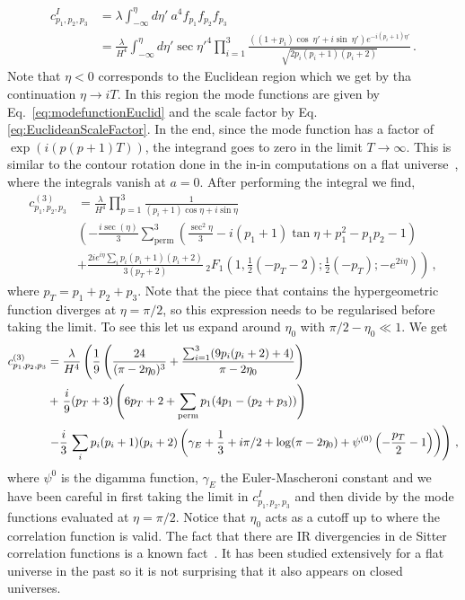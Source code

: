 \documentclass[a4paper,11pt]{article}
\numberwithin{equation}{section}
\numberwithin{equation}{section}
\begin{document}
\begin{align} c^I_{p_1,p_2,p_3}&=\lambda \int_{-\infty}^\eta  d\eta'\  a^4 f_{p_1}f_{p_2}f_{p_3}\\
 &=\frac{\lambda}{H^4}\int_{-\infty}^{\eta} d\eta' \sec{\eta'}^4\prod_{i=1}^3 \frac{((1+p_i)\cos\ \eta'+i\sin\ \eta' )e^{-i(p_i+1)\eta'}}{\sqrt{2p_i(p_i+1)(p_i+2)}} \,.
\end{align}
Note that  $\eta<0$ corresponds to the Euclidean region  which we get by tha continuation $\eta\to i T$. In this region the mode functions are given by Eq.~\eqref{eq:modefunctionEuclid} and the scale factor by Eq.~ \eqref{eq:EuclideanScaleFactor}. In the end, since the mode function has a factor of $\exp(i(p(p+1)T))$, the integrand goes to zero  in the limit $T\to\infty$. This is similar to the contour rotation done in the in-in computations on a flat universe~\cite{Maldacena:2002vr}, where the integrals vanish at $a=0$. 
After performing the integral we find,
\begin{align}
c^{(3)}_{p_1,p_2,p_3}&=\frac{\lambda}{H^4}\prod_{p=1}^3\frac{1}{(p_i+1)\cos\eta+i\sin\eta}\nonumber\\
  & \left(-\frac{i\sec (\eta )}{3} \sum_{\mathrm{perm}}^3\left(\frac{\sec^2\eta}{3}-i (p_1+1)\tan\eta+p_1^2-p_1 p_2-1\right)\right. \nonumber\\
   &\left.+\frac{2 i e^{i \eta }\sum_i p_i (p_i+1)
   (p_i+2)}{3 (p_T+2) } \, _2F_1\left(1,\frac{1}{2}
   (-p_T-2);\frac{1}{2} (-p_T);-e^{2
   i \eta }\right)\right) \,,
\end{align}
where $p_T = p_1 + p_2 + p_3$. Note that the piece that contains the hypergeometric function diverges at $\eta=\pi/2$, so this expression needs to be regularised before taking the limit. To see this let us expand around $\eta_0$ with $\pi/2-\eta_0\ll1$. We get
\begin{align}
c^{(3)}_{p_1,p_2,p_3}&=\frac{\lambda}{H^4}\left(\frac{1}{9} \left(\frac{24}{(\pi -2 \eta_0 )^3}+\frac{\sum_{i=1}^3 (9 p_i (p_i+2)+4)}{\pi -2 \eta_0 }\right)\right.\nonumber\\
&+\left.\frac{i}{9} (p_T+3) \left(6 p_T+2+\sum_{\rm{perm}} p_1(4 p_1-(p_2+p_3))\right)\right.\nonumber\\
&\left. - \frac{i}{3} \, \sum_i p_i (p_i+1)
   (p_i+2)\left(\gamma_E+\frac{1}{3}+i\pi/2+\log(\pi-2\eta_0)+\psi ^{(0)}\left(-\frac{p_T}{2}-1\right)\right)\right) \,,
\end{align}
where $\psi^0$ is the digamma function, $\gamma_E$ the Euler-Mascheroni constant and   we have been careful in first taking the limit in $c_{p_1,p_2,p_3}^I$ and then divide by the mode functions evaluated at $\eta=\pi/2$. Notice that  $\eta_0$ acts as a cutoff up to where the correlation function is valid.
The fact that there are IR divergencies in de Sitter correlation functions is a known fact~\cite{Weinberg:2006ac,Burgess:2009bs,Seery:2010kh,Burgess:2010dd,Giddings:2011ze,Anninos:2014lwa, Cespedes:2020xqq}. It has been studied extensively for a flat universe in the past so it is not surprising that it also appears on closed universes.  
\end{document}
